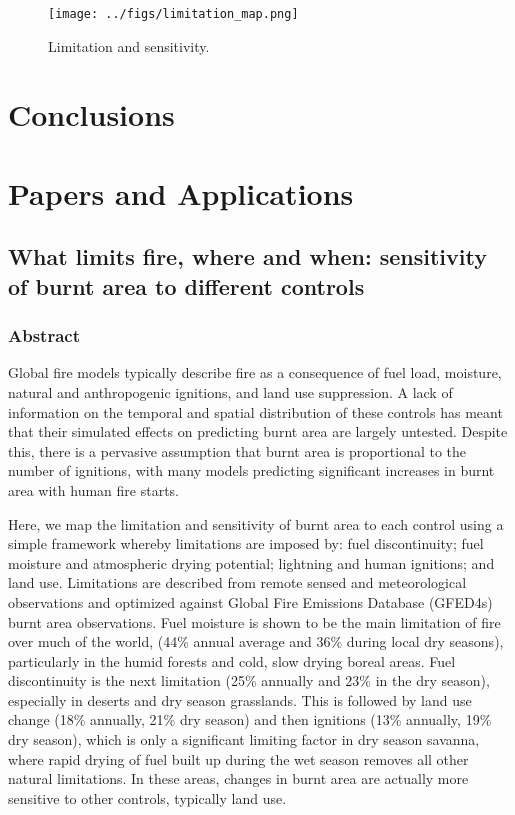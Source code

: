 \documentclass[12pt]{article}
\begin{document}
\begin{figure}[!ht]
  \centering
    \texttt{[image: ../figs/limitation\_map.png]}

  \caption{Limitation and sensitivity.}
\end{figure}

\section{Conclusions}\label{conclusions}

\section{Papers and Applications}

\subsection{What limits fire, where and when: sensitivity of burnt area to different controls}

\subsubsection{Abstract}
Global fire models typically describe fire as a consequence of fuel load, moisture, natural and anthropogenic
ignitions, and land use suppression. A lack of information on the temporal and spatial distribution of these
controls has meant that their simulated effects on predicting burnt area are largely untested. Despite this,
there is a pervasive assumption that burnt area is proportional to the number of ignitions, with many models
predicting significant increases in burnt area with human fire starts.


Here, we map the limitation and sensitivity of burnt area to each control using a simple framework whereby
limitations are imposed by: fuel discontinuity; fuel moisture and atmospheric drying potential; lightning and
human ignitions; and land use. Limitations are described from remote sensed and meteorological
observations and optimized against Global Fire Emissions Database (GFED4s) burnt area observations.
Fuel moisture is shown to be the main limitation of fire over much of the world, (44\% annual average and
36\% during local dry seasons), particularly in the humid forests and cold, slow drying boreal areas. Fuel
discontinuity is the next limitation (25\% annually and 23\% in the dry season), especially in deserts and dry
season grasslands. This is followed by land use change (18\% annually, 21\% dry season) and then ignitions
(13\% annually, 19\% dry season), which is only a significant limiting factor in dry season savanna, where
rapid drying of fuel built up during the wet season removes all other natural limitations. In these areas,
changes in burnt area are actually more sensitive to other controls, typically land use.
\end{document}
